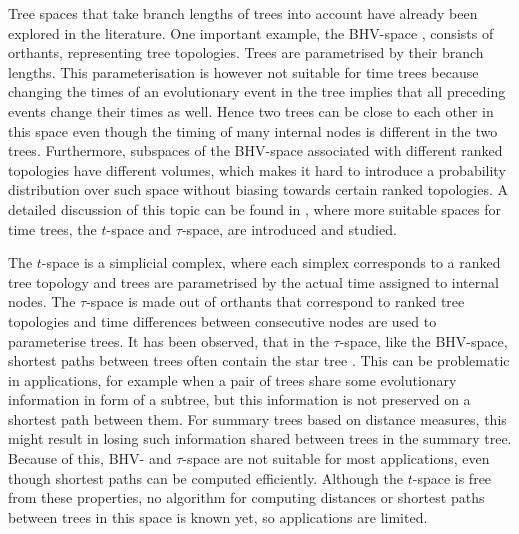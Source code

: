 \documentclass[11pt]{amsart}
\newcommand{\summary}[1]{} %
\begin{document}
\summary{Known tree spaces -- BHV, $t$-space and $\tau$-space}
Tree spaces that take branch lengths of trees into account have already been explored in the literature.
One important example, the BHV-space \autocite{Billera2001-rj}, consists of orthants, representing tree topologies.
Trees are parametrised by their branch lengths.
This parameterisation is however not suitable for time trees because changing the times of an evolutionary event in the tree implies that all preceding events change their times as well.
Hence two trees can be close to each other in this space even though the timing of many internal nodes is different in the two trees.
Furthermore, subspaces of the BHV-space associated with different ranked topologies have different volumes, which makes it hard to introduce a probability distribution over such space without biasing towards certain ranked topologies.
A detailed discussion of this topic can be found in \autocite{Gavryushkin2016-uu}, where more suitable spaces for time trees, the $t$-space and $\tau$-space, are introduced and studied.

The $t$-space is a simplicial complex, where each simplex corresponds to a ranked tree topology and trees are parametrised by the actual time assigned to internal nodes.
The $\tau$-space is made out of orthants that correspond to ranked tree topologies and time differences between consecutive nodes are used to parameterise trees.
It has been observed, that in the $\tau$-space, like the BHV-space, shortest paths between trees often contain the star tree \autocite{Gavryushkin2016-uu}.
This can be problematic in applications, for example when a pair of trees share some evolutionary information in form of a subtree, but this information is not preserved on a shortest path between them.
For summary trees based on distance measures, this might result in losing such information shared between trees in the summary tree.
Because of this, BHV- and $\tau$-space are not suitable for most applications, even though shortest paths can be computed efficiently.
Although the $t$-space is free from these properties, no algorithm for computing distances or shortest paths between trees in this space is known yet, so applications are limited.
\end{document}
